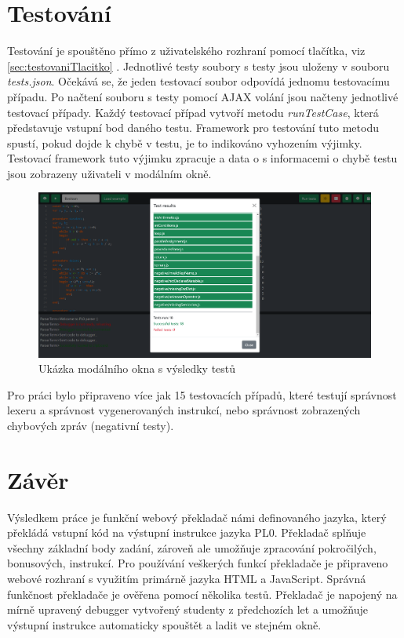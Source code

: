 \documentclass[12pt, letterpaper]{article}
\newcommand{\chapterRef}[1]{\ref{#1} \nameref{#1}}
\begin{document}
\section{Testování}\label{sec:testovani}
Testování je spouštěno přímo z uživatelského rozhraní pomocí tlačítka, viz \chapterRef{sec:testovaniTlacitko}. Jednotlivé testy soubory s testy jsou uloženy v souboru \textit{tests.json}. Očekává se, že jeden testovací soubor odpovídá jednomu testovacímu případu. Po načtení souboru s testy pomocí AJAX volání jsou načteny jednotlivé testovací případy. Každý testovací případ vytvoří metodu \textit{runTestCase}, která představuje vstupní bod daného testu. Framework pro testování tuto metodu spustí, pokud dojde k chybě v testu, je to indikováno vyhozením výjimky. Testovací framework tuto výjimku zpracuje a data o s informacemi o chybě testu jsou zobrazeny uživateli v modálním okně. 

\begin{figure}[H]
	\centering
	\includegraphics[width=\linewidth]{img/test_modal.png}
	\caption{Ukázka modálního okna s výsledky testů}
	\label{fig:TestModal}
\end{figure}

Pro práci bylo připraveno více jak 15 testovacích případů, které testují správnost lexeru a správnost vygenerovaných instrukcí, nebo správnost zobrazených chybových zpráv (negativní testy).
%
\section{Závěr}
Výsledkem práce je funkční webový překladač námi definovaného jazyka, který překládá vstupní kód na výstupní instrukce jazyka PL0. Překladač splňuje všechny základní body zadání, zároveň ale umožňuje zpracování pokročilých, bonusových, instrukcí. Pro používání veškerých funkcí překladače je připraveno webové rozhraní s využitím primárně jazyka HTML a JavaScript. Správná funkčnost překladače je ověřena pomocí několika testů. Překladač je napojený na mírně upravený debugger vytvořený studenty z předchozích let a umožňuje výstupní instrukce automaticky spouštět a ladit ve stejném okně. 
\end{document}

